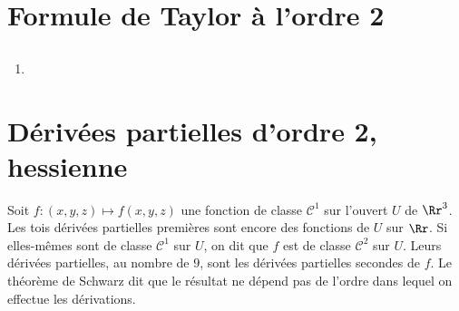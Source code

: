 \documentclass[12pt, class=report,crop=false]{standalone}
\begin{document}

\newcommand{\ou}{\mathscr{O}}
\newcommand{\f}{\mathscr{F}}
\newcommand{\mat}{\mathscr{M}}
\newcommand{\co}{\mathscr{C}}




\section{Formule de Taylor à l'ordre 2}

\subsection{}


\subsection{}


\subsection{}


\subsection{}
 
 
\begin{miniexercices}
\sauteligne
\begin{enumerate}
  \item 
\end{enumerate}
\end{miniexercices}

\section{Dérivées partielles d'ordre 2, hessienne}

\vskip4mm

\noindent Soit $f:(x,y,z)\mapsto f(x,y,z)$ une fonction de classe $\mathscr{C}^1$ sur l'ouvert $U$ de $\Rr^3$. Les tois dérivées partielles premières sont encore des fonctions de $U$ sur $\Rr$. Si elles-m\^emes sont de classe $\mathscr{C}^1$ sur $U$, on dit que $f$ est de classe $\mathscr{C}^2$ sur $U$. Leurs dérivées partielles, au nombre de $9$, sont les dérivées partielles secondes de $f$. Le théorème de Schwarz dit que le résultat ne dépend pas de l'ordre dans lequel on effectue les dérivations.
\end{document}
